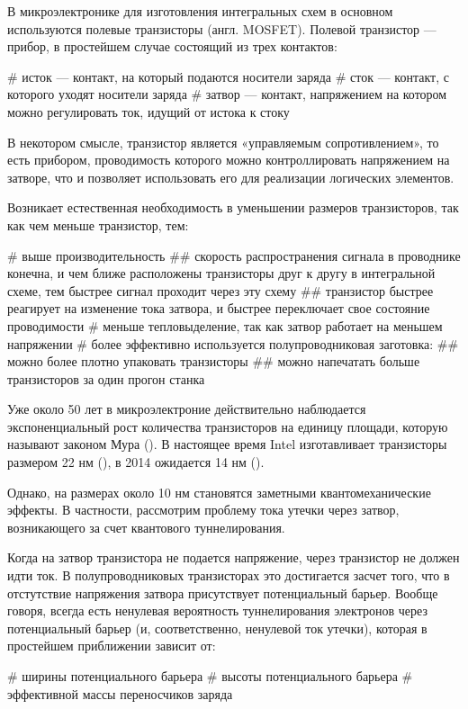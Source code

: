 \startprefacepage

В микроэлектронике для изготовления интегральных схем в основном используются полевые транзисторы (англ. MOSFET). Полевой транзистор — прибор, в простейшем случае состоящий из трех контактов:
\begin{easylist}[itemize]
# исток — контакт, на который подаются носители заряда
# сток — контакт, с которого уходят носители заряда
# затвор — контакт, напряжением на котором можно регулировать ток, идущий от истока к стоку
\end{easylist}
В некотором смысле, транзистор является «управляемым сопротивлением», то есть прибором, проводимость которого можно контроллировать напряжением на затворе, что и позволяет использовать его для реализации логических элементов.

Возникает естественная необходимость в уменьшении размеров транзисторов, так как чем меньше транзистор, тем:
\begin{easylist}[itemize]
# выше производительность
## скорость распространения сигнала в проводнике конечна, и чем ближе расположены транзисторы друг к другу в интегральной схеме, тем быстрее сигнал проходит через эту схему
## транзистор быстрее реагирует на изменение тока затвора, и быстрее переключает свое состояние проводимости
# меньше тепловыделение, так как затвор работает на меньшем напряжении
# более эффективно используется полупроводниковая заготовка:
## можно более плотно упаковать транзисторы
## можно напечатать больше транзисторов за один прогон станка
\end{easylist}

Уже около 50 лет в микроэлектроние действительно наблюдается экспоненциальный рост количества транзисторов на единицу площади, которую называют законом Мура (). В настоящее время Intel изготавливает транзисторы размером 22 нм (), в 2014 ожидается 14 нм ().

Однако, на размерах около 10 нм становятся заметными квантомеханические эффекты. В частности, рассмотрим проблему тока утечки через затвор, возникающего за счет квантового туннелирования.

Когда на затвор транзистора не подается напряжение, через транзистор не должен идти ток. В полупроводниковых транзисторах это достигается засчет того, что в отстутствие напряжения затвора присутствует потенциальный барьер. Вообще говоря, всегда есть ненулевая вероятность туннелирования электронов через потенциальный барьер (и, соответственно, ненулевой ток утечки), которая в простейшем приближении  зависит от:
\begin{easylist}[itemize]
# ширины потенциального барьера
# высоты потенциального барьера
# эффективной массы переносчиков заряда %
\end{easylist}

